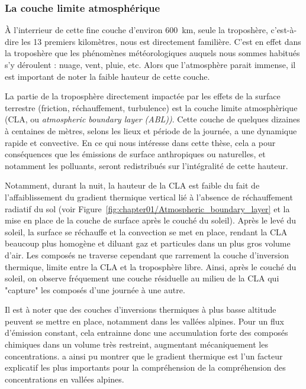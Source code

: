 \subsubsection{La couche limite atmosphérique}%
\label{sub:la_couche_limite_atmospherique}

À l'interrieur de cette fine couche d'environ \SI{600}{km}, seule la troposhère,
c'est-à-dire les 13 premiers kilomètres, nous est directement familière. C'est en effet
dans la troposhère que les phénomènes météorologiques auquels nous sommes habitués s'y
déroulent : nuage, vent, pluie, etc. Alors que l'atmosphère parait immense, il est
important de noter la faible hauteur de cette couche.

La partie de la troposphère directement impactée par les effets de la surface terrestre
(friction, réchauffement, turbulence) est la couche limite atmosphèrique (CLA, ou
\textit{atmospheric boundary layer (ABL))}. Cette couche de quelques dizaines à centaines
de mètres, selons les lieux et période de la journée, a une dynamique rapide et
convective. En ce qui nous intéresse dans cette thèse, cela a pour conséquences que les
émissions de surface anthropiques ou naturelles, et notamment les polluants, seront
redistribués sur l'intégralité de cette hauteur.

Notamment, durant la nuit, la hauteur de la CLA est faible du fait de l'affaiblissement du
gradient thermique vertical lié à l'absence de réchauffement radiatif du sol (voir
Figure~\ref{fig:chapter01/Atmospheric_boundary_layer} et la mise en place de la couche de
surface après le couché du soleil). Après le levé du soleil, la surface se réchauffe et la
convection se met en place, rendant la CLA beaucoup plus homogène et diluant gaz et
particules dans un plus gros volume d'air. Les composés ne traverse cependant que
rarrement la couche d'inversion thermique, limite entre la CLA et la troposphère libre.
Ainsi, après le couché du soleil, on observe fréquement une couche résiduelle au milieu de
la CLA qui "capture" les composés d'une journée à une autre.

Il est à noter que des couches d'inversions thermiques à plus basse altitude peuvent se
mettre en place, notamment dans les vallées alpines. Pour un flux d'émission
constant, cela entrainne donc une accumulation forte des composés chimiques dans un volume
très restreint, augmentant mécaniquement les concentrations.
\textcite{allardQualite2018} a ainsi pu montrer que le gradient thermique est l'un facteur
explicatif les plus importants pour la compréhension de la compréhension des
concentrations en vallées alpines.

